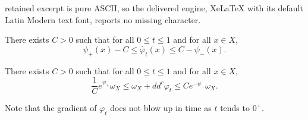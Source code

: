 \documentclass[10pt,a4paper]{amsart}
\newcommand{\f}{\varphi}
\newcommand{\p}{\psi}
\begin{document}
retained excerpt is pure ASCII, so the delivered engine, XeLaTeX with its default Latin Modern text font, reports no missing character.
\begin{lem} \label{lem:bddphidot}
There exists $C>0$ such that for all $0 \leq t \leq 1$ and for all $x \in X$,
$$
 {\p_+}(x) -C   \leq   \dot{\f_t}(x) \leq C-{\p_-}(x) .
$$
\end{lem}

\begin{thm} \label{thm:laplace}
There exists $C>0$ such that for all $0 \leq t \leq 1$ and for all $x \in X$,
$$
\frac{1}{C} e^{\p_+} \omega_X \leq \omega_X+dd^c \f_t \leq C e^{-\p_-} \omega_X.
$$
\end{thm}

\begin{rem}
Note that the gradient of $\dot{\f_t}$ does not blow up in time as $t$ tends to $0^+$.
\end{rem}
\end{document}
